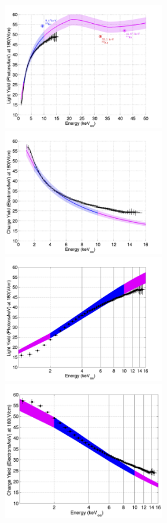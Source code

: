  \begin{figure}[h!]\centering
\includegraphics[width=70mm]{LY_180_band_Tritium_Dec_2013_Charge_Yield_180_corr.png}
\includegraphics[width=70mm]{QY_180_Tritium_Dec_2013_Charge_Yield_180_corr.png}
\includegraphics[width=70mm]{LY_180_band_log_Tritium_Dec_2013_Charge_Yield_180_corr.png}
\includegraphics[width=70mm]{QY_180_log_Tritium_Dec_2013_Charge_Yield_180_corr.png}

\end{figure}
